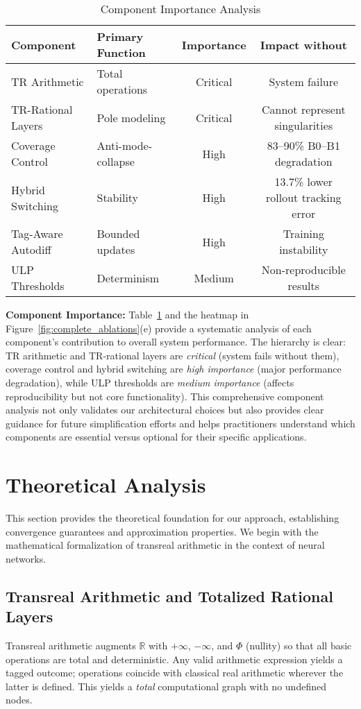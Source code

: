 \documentclass[twoside,11pt]{article}
\newcommand{\RR}{\mathbb{R}}
\begin{document}
\begin{table}[t]
\centering
\caption{Component Importance Analysis}
\label{tab:component_importance}
\begin{tabular}{llcc}
\toprule
Component & Primary Function & Importance & Impact without \\
\midrule
TR Arithmetic & Total operations & Critical & System failure \\
TR-Rational Layers & Pole modeling & Critical & Cannot represent singularities \\
Coverage Control & Anti-mode-collapse & High & 83--90\% B0--B1 degradation \\
Hybrid Switching & Stability & High & 13.7\% lower rollout tracking error \\
Tag-Aware Autodiff & Bounded updates & High & Training instability \\
ULP Thresholds & Determinism & Medium & Non-reproducible results \\
\bottomrule
\end{tabular}
\end{table}

\textbf{Component Importance:} Table~\ref{tab:component_importance} and the heatmap in Figure~\ref{fig:complete_ablations}(e) provide a systematic analysis of each component's contribution to overall system performance. The hierarchy is clear: TR arithmetic and TR-rational layers are \emph{critical} (system fails without them), coverage control and hybrid switching are \emph{high importance} (major performance degradation), while ULP thresholds are \emph{medium importance} (affects reproducibility but not core functionality). This comprehensive component analysis not only validates our architectural choices but also provides clear guidance for future simplification efforts and helps practitioners understand which components are essential versus optional for their specific applications.

\section{Theoretical Analysis}
\label{sec:theory}
This section provides the theoretical foundation for our approach, establishing convergence guarantees and approximation properties. We begin with the mathematical formalization of transreal arithmetic in the context of neural networks.

\subsection{Transreal Arithmetic and Totalized Rational Layers}
Transreal arithmetic augments $\RR$ with $+\infty$, $-\infty$, and $\Phi$ (nullity) so that all basic operations are total and deterministic. Any valid arithmetic expression yields a tagged outcome; operations coincide with classical real arithmetic wherever the latter is defined. This yields a \emph{total} computational graph with no undefined nodes.
\end{document}
